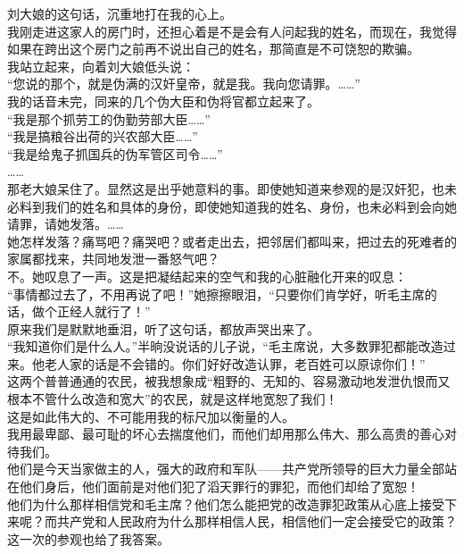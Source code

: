 刘大娘的这句话，沉重地打在我的心上。\\

我刚走进这家人的房门时，还担心着是不是会有人问起我的姓名，而现在，我觉得如果在跨出这个房门之前再不说出自己的姓名，那简直是不可饶恕的欺骗。\\

我站立起来，向着刘大娘低头说：\\

“您说的那个，就是伪满的汉奸皇帝，就是我。我向您请罪。……”\\

我的话音未完，同来的几个伪大臣和伪将官都立起来了。\\

“我是那个抓劳工的伪勤劳部大臣……”\\

“我是搞粮谷出荷的兴农部大臣……”\\

“我是给鬼子抓国兵的伪军管区司令……”\\

……\\

那老大娘呆住了。显然这是出乎她意料的事。即使她知道来参观的是汉奸犯，也未必料到我们的姓名和具体的身份，即使她知道我的姓名、身份，也未必料到会向她请罪，请她发落。……\\

她怎样发落？痛骂吧？痛哭吧？或者走出去，把邻居们都叫来，把过去的死难者的家属都找来，共同地发泄一番怒气吧？\\

不。她叹息了一声。这是把凝结起来的空气和我的心脏融化开来的叹息：\\

“事情都过去了，不用再说了吧！”她擦擦眼泪，“只要你们肯学好，听毛主席的话，做个正经人就行了！”\\

原来我们是默默地垂泪，听了这句话，都放声哭出来了。\\

“我知道你们是什么人。”半晌没说话的儿子说，“毛主席说，大多数罪犯都能改造过来。他老人家的话是不会错的。你们好好改造认罪，老百姓可以原谅你们！”\\

这两个普普通通的农民，被我想象成“粗野的、无知的、容易激动地发泄仇恨而又根本不管什么改造和宽大”的农民，就是这样地宽恕了我们！\\

这是如此伟大的、不可能用我的标尺加以衡量的人。\\

我用最卑鄙、最可耻的坏心去揣度他们，而他们却用那么伟大、那么高贵的善心对待我们。\\

他们是今天当家做主的人，强大的政府和军队——共产党所领导的巨大力量全部站在他们身后，他们面前是对他们犯了滔天罪行的罪犯，而他们却给了宽恕！\\

他们为什么那样相信党和毛主席？他们怎么能把党的改造罪犯政策从心底上接受下来呢？而共产党和人民政府为什么那样相信人民，相信他们一定会接受它的政策？\\

这一次的参观也给了我答案。